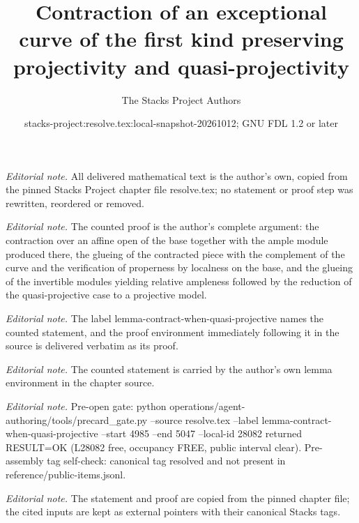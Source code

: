 \documentclass[10pt,a4paper]{amsart}
\title{Contraction of an exceptional curve of the first kind preserving projectivity and quasi-projectivity}
\author{The Stacks Project Authors}
\date{stacks-project:resolve.tex:local-snapshot-20261012; GNU FDL 1.2 or later}
\theoremstyle{plain}
\theoremstyle{definition}
\theoremstyle{remark}
\numberwithin{equation}{subsection}
\begin{document}
\maketitle
\noindent\textit{Editorial note.} All delivered mathematical text is the author's own, copied from the pinned Stacks Project chapter file resolve.tex; no statement or proof step was rewritten, reordered or removed.\par\medskip
\noindent\textit{Editorial note.} The counted proof is the author's complete argument: the contraction over an affine open of the base together with the ample module produced there, the glueing of the contracted piece with the complement of the curve and the verification of properness by localness on the base, and the glueing of the invertible modules yielding relative ampleness followed by the reduction of the quasi-projective case to a projective model.\par\medskip
\noindent\textit{Editorial note.} The label lemma-contract-when-quasi-projective names the counted statement, and the proof environment immediately following it in the source is delivered verbatim as its proof.\par\medskip
\noindent\textit{Editorial note.} The counted statement is carried by the author's own lemma environment in the chapter source.\par\medskip
\noindent\textit{Editorial note.} Pre-open gate: python operations/agent-authoring/tools/precard\_gate.py --source resolve.tex --label lemma-contract-when-quasi-projective --start 4985 --end 5047 --local-id 28082 returned RESULT=OK (L28082 free, occupancy FREE, public interval clear). Pre-assembly tag self-check: canonical tag resolved and not present in reference/public-items.jsonl.\par\medskip
\noindent\textit{Editorial note.} The statement and proof are copied from the pinned chapter file; the cited inputs are kept as external pointers with their canonical Stacks tags.\par\medskip
\end{document}
